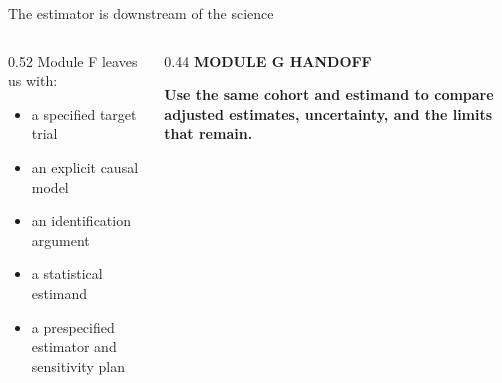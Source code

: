 \documentclass[aspectratio=169]{beamer}
\begin{document}
\begin{frame}{The estimator is downstream of the science}
  \begin{columns}[T,onlytextwidth]
    \begin{column}{0.52\textwidth}
      {\large\color{black!55}Module F leaves us with:}
      \begin{itemize}
        \item a specified target trial
        \item an explicit causal model
        \item an identification argument
        \item a statistical estimand
        \item a prespecified estimator and sensitivity plan
      \end{itemize}
    \end{column}
    \begin{column}{0.44\textwidth}
      {\large\bfseries\color{navorange}MODULE G HANDOFF}

      \vspace{0.3cm}
      {\large\bfseries
        Use the same cohort and estimand to compare adjusted estimates,
        uncertainty, and the limits that remain.}

      \vspace{0.45cm}
    \end{column}
  \end{columns}
\end{frame}
\end{document}

